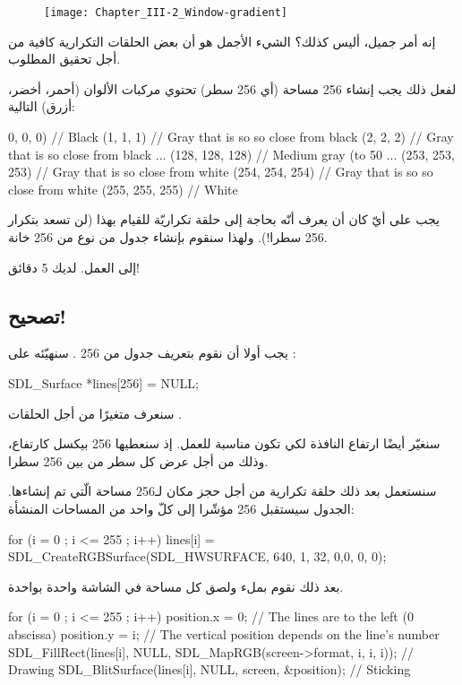 \begin{figure}[H]
	\centering
	\texttt{[image: Chapter\_III-2\_Window-gradient]}
\end{figure}

 إنه أمر جميل، أليس كذلك؟ الشيء الأجمل هو أن بعض الحلقات التكرارية كافية من أجل تحقيق المطلوب.
 
لفعل ذلك يجب إنشاء 256 مساحة (أي 256 سطر) تحتوي مركبات الألوان (أحمر، أخضر، أزرق) التالية:

\begin{Csource}
0, 0, 0) // Black
(1, 1, 1) // Gray that is so so close from black
(2, 2, 2) // Gray that is so close from black
...
(128, 128, 128) // Medium gray (to 50 %
...
(253, 253, 253) // Gray that is so close from white
(254, 254, 254) // Gray that is so so close from white
(255, 255, 255) // White
\end{Csource}

يجب على أيّ كان أن يعرف أنّه بحاجة إلى حلقة تكراريّة للقيام بهذا (لن تسعد بتكرار 256 سطرا!). ولهذا سنقوم بإنشاء جدول من نوع 
من 256 خانة.

إلى العمل. لديك 5 دقائق!

\subsection{تصحيح!}
 
يجب أولا أن نقوم بتعريف جدول من 256
.
سنهيّئه على
:

\begin{Csource}
SDL_Surface *lines[256] = {NULL};
\end{Csource}

سنعرف متغيرًا
من أجل الحلقات 
.

سنغيّر أيضًا ارتفاع النافذة لكي تكون مناسبة للعمل. إذ سنعطيها 256 بيكسل كارتفاع، وذلك من أجل عرض كل سطر من بين 256 سطرا.

سنستعمل بعد ذلك حلقة تكرارية
من أجل حجز مكان لـ256 مساحة الّتي تم إنشاءها. الجدول سيستقبل 256 مؤشّرا إلى كلّ واحد من المساحات المنشأة:

\begin{Csource}
for (i = 0 ; i <= 255 ; i++)
	lines[i] = SDL_CreateRGBSurface(SDL_HWSURFACE, 640, 1, 32, 0,0, 0, 0);
\end{Csource}

بعد ذلك نقوم بملء ولصق كل مساحة في الشاشة واحدة بواحدة.

\begin{Csource}
for (i = 0 ; i <= 255 ; i++)
{
	position.x = 0; // The lines are to the left (0 abscissa)
	position.y = i; // The vertical position depends on the line's number
	SDL_FillRect(lines[i], NULL, SDL_MapRGB(screen->format, i, i, i)); // Drawing
	SDL_BlitSurface(lines[i], NULL, screen, &position); // Sticking
}
\end{Csource}

